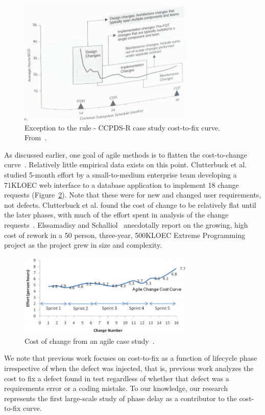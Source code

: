 \begin{figure}[!ht]
 \includegraphics[width=3.3in]{Royce98.PNG}
 \caption{Exception to the rule - CCPDS-R case study cost-to-fix curve. From~\cite{Royce98}. }\label{fig:royce}
 \end{figure}
 
As discussed earlier, one goal of agile methods is to flatten the cost-to-change curve~\cite{beck00}. Relatively little empirical data exists on this point. Clutterbuck et al.~\cite{Clutterbuck09} studied 5-month effort by a small-to-medium enterprise team developing a 71KLOEC web interface to a database application to implement 18 change requests (Figure~\ref{fig:clutterbuck}). Note that these were for new and changed user requirements, not defects. Clutterbuck et al. found the cost of change to be relatively flat until the later phases, with much of the effort spent in analysis of the change requests~\cite{Clutterbuck09}. Elssamadisy and Schalliol~\cite{Elssamadisy02} anecdotally report on the growing, high cost of rework in a 50 person, three-year, 500KLOEC Extreme Programming project as the project grew in size and complexity.

\begin{figure}[!ht]
 \includegraphics[width=3.3in]{clutterbuck.png}
 \caption{Cost of change from an agile case study~\cite{Clutterbuck09}.}\label{fig:clutterbuck}
 \end{figure}
 
 We note that previous work focuses on cost-to-fix as a function of lifecycle phase irrespective of when the defect was injected, that is, previous work analyzes the cost to fix a defect found in test regardless of whether that defect was a requirements error or a coding mistake. To our knowledge, our research represents the first large-scale study of phase delay as a contributor to the cost-to-fix curve.